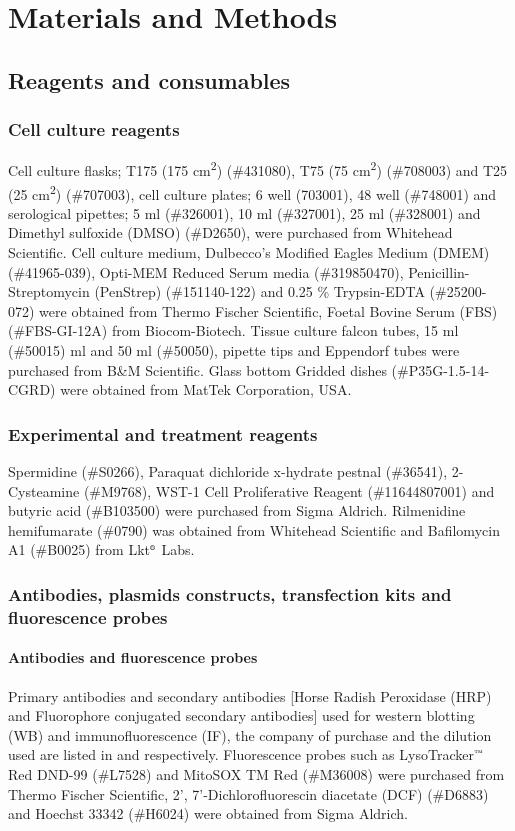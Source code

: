 \chapter{Materials and Methods}
\label{sec:chapter2}
\section{Reagents and consumables}
\subsection{Cell culture reagents}
Cell culture flasks; T175 (175 cm\textsuperscript{2}) (\#431080), T75 (75 cm\textsuperscript{2}) (\#708003) and T25 (25 cm\textsuperscript{2}) (\#707003), cell culture plates; 6 well (703001), 48 well (\#748001) and serological pipettes; 5 ml (\#326001), 10 ml (\#327001), 25 ml (\#328001) and Dimethyl sulfoxide (DMSO) (\#D2650), were purchased from Whitehead Scientific. Cell culture medium, Dulbecco’s Modified Eagles Medium (DMEM) (\#41965-039), Opti-MEM Reduced Serum media (\#319850470), Penicillin-Streptomycin (PenStrep) (\#151140-122) and 0.25 \% Trypsin-EDTA (\#25200-072) were obtained from Thermo Fischer Scientific, Foetal Bovine Serum (FBS) (\#FBS-GI-12A) from Biocom-Biotech. Tissue culture falcon tubes, 15 ml (\#50015) ml and 50 ml (\#50050), pipette tips and Eppendorf tubes were purchased from B\&M Scientific. Glass bottom Gridded dishes (\#P35G-1.5-14-CGRD) were obtained from MatTek Corporation, USA.

\subsection{Experimental and treatment reagents}
Spermidine (\#S0266), Paraquat dichloride x-hydrate pestnal (\#36541), 2-Cysteamine (\#M9768), WST-1 Cell Proliferative Reagent (\#11644807001) and butyric acid (\#B103500) were purchased from Sigma Aldrich. Rilmenidine hemifumarate (\#0790) was obtained from Whitehead Scientific and Bafilomycin A1 (\#B0025) from Lkt${\textsuperscript{\tiny{\textregistered}}}$ Labs. 

\subsection{Antibodies, plasmids constructs, transfection kits and fluorescence probes}
\subsubsection{Antibodies and fluorescence probes}
Primary antibodies and secondary antibodies [Horse Radish Peroxidase (HRP) and Fluorophore conjugated secondary antibodies] used for western blotting (WB) and immunofluorescence (IF), the company of purchase and the dilution used are listed in  and  respectively. Fluorescence probes such as LysoTracker${\textsuperscript{\tiny{\texttrademark}}}$ Red DND-99 (\#L7528) and MitoSOX TM Red (\#M36008) were purchased from Thermo Fischer Scientific, 2', 7'-Dichlorofluorescin diacetate (DCF) (\#D6883) and Hoechst 33342 (\#H6024) were obtained from Sigma Aldrich.

